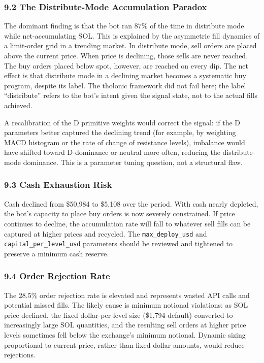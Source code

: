 \documentclass[
  11pt,
  letterpaper,
]{article}
\begin{document}
\subsubsection{9.2 The Distribute-Mode Accumulation
Paradox}\label{the-distribute-mode-accumulation-paradox}

The dominant finding is that the bot ran 87\% of the time in distribute
mode while net-accumulating SOL. This is explained by the asymmetric
fill dynamics of a limit-order grid in a trending market. In distribute
mode, sell orders are placed above the current price. When price is
declining, those sells are never reached. The buy orders placed below
spot, however, are reached on every dip. The net effect is that
distribute mode in a declining market becomes a systematic buy program,
despite its label. The tholonic framework did not fail here; the label
``distribute'' refers to the bot's intent given the signal state, not to
the actual fills achieved.

A recalibration of the D primitive weights would correct the signal: if
the D parameters better captured the declining trend (for example, by
weighting MACD histogram or the rate of change of resistance levels),
imbalance would have shifted toward D-dominance or neutral more often,
reducing the distribute-mode dominance. This is a parameter tuning
question, not a structural flaw.

\subsubsection{9.3 Cash Exhaustion Risk}\label{cash-exhaustion-risk}

Cash declined from \$50,984 to \$5,108 over the period. With cash nearly
depleted, the bot's capacity to place buy orders is now severely
constrained. If price continues to decline, the accumulation rate will
fall to whatever sell fills can be captured at higher prices and
recycled. The \texttt{max\_deploy\_usd} and
\texttt{capital\_per\_level\_usd} parameters should be reviewed and
tightened to preserve a minimum cash reserve.

\subsubsection{9.4 Order Rejection Rate}\label{order-rejection-rate}

The 28.5\% order rejection rate is elevated and represents wasted API
calls and potential missed fills. The likely cause is minimum notional
violations: as SOL price declined, the fixed dollar-per-level size
(\$1,794 default) converted to increasingly large SOL quantities, and
the resulting sell orders at higher price levels sometimes fell below
the exchange's minimum notional. Dynamic sizing proportional to current
price, rather than fixed dollar amounts, would reduce rejections.
\end{document}

